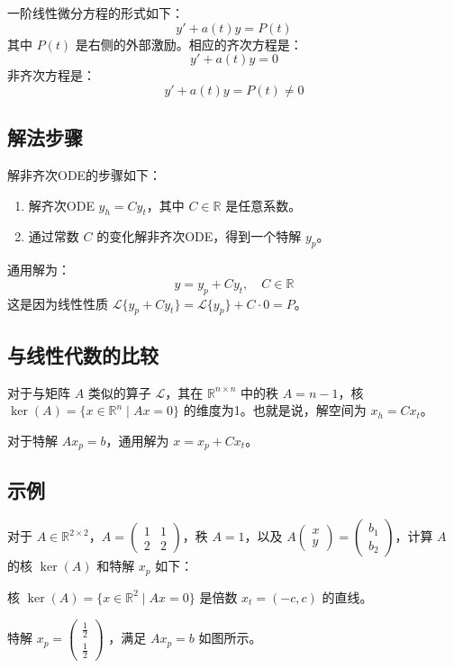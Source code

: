 \documentclass{ctexart}
\begin{document}
一阶线性微分方程的形式如下：
\[
y' + a(t)y = P(t)
\]
其中 \( P(t) \) 是右侧的外部激励。相应的齐次方程是：
\[
y' + a(t)y = 0
\]
非齐次方程是：
\[
y' + a(t)y = P(t) \neq 0
\]

\subsection*{解法步骤}
解非齐次ODE的步骤如下：
\begin{enumerate}
    \item 解齐次ODE \( y_h = C y_t \)，其中 \( C \in \mathbb{R} \) 是任意系数。
    \item 通过常数 \( C \) 的变化解非齐次ODE，得到一个特解 \( y_p \)。
\end{enumerate}
通用解为：
\[
y = y_p + C y_t, \quad C \in \mathbb{R}
\]
这是因为线性性质 \( \mathcal{L}\{y_p + C y_t\} = \mathcal{L}\{y_p\} + C \cdot 0 = P \)。

\subsection*{与线性代数的比较}
对于与矩阵 \( A \) 类似的算子 \( \mathcal{L} \)，其在 \( \mathbb{R}^{n \times n} \) 中的秩 \( A = n-1 \)，核 \( \ker(A) = \{ x \in \mathbb{R}^n \mid Ax = 0 \} \) 的维度为1。也就是说，解空间为 \( x_h = C x_t \)。

对于特解 \( A x_p = b \)，通用解为 \( x = x_p + C x_t \)。

\subsection*{示例}
对于 \( A \in \mathbb{R}^{2 \times 2} \)，\( A = \begin{pmatrix} 1 & 1 \\ 2 & 2 \end{pmatrix} \)，秩 \( A = 1 \)，以及 \( A \begin{pmatrix} x \\ y \end{pmatrix} = \begin{pmatrix} b_1 \\ b_2 \end{pmatrix} \)，计算 \( A \) 的核 \( \ker(A) \) 和特解 \( x_p \) 如下：

核 \( \ker(A) = \{ x \in \mathbb{R}^2 \mid Ax = 0 \} \) 是倍数 \( x_t = (-c, c) \) 的直线。

特解 \( x_p = \begin{pmatrix} \frac{1}{2} \\ \frac{1}{2} \end{pmatrix} \) ，满足 \( A x_p = b \) 如图所示。
\end{document}

